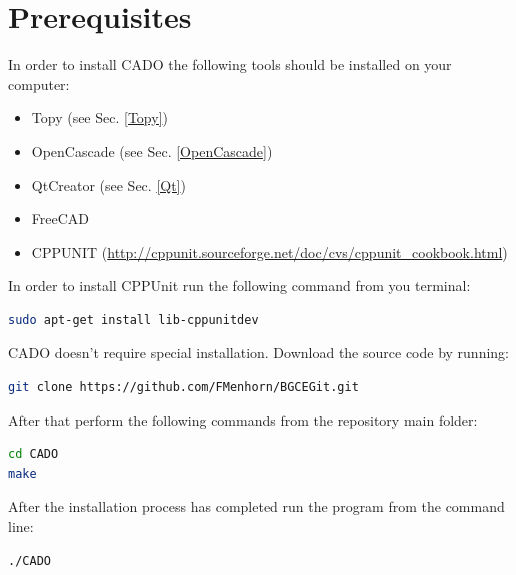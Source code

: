 \documentclass[11pt,a4paper,article,bibtotoc,idxtotoc,headsepline,footsepline,footexclude,DIV13,oneside]{scrbook}
\begin{document}
\section{Prerequisites}
In order to install CADO the following tools should be installed on your computer:
\begin{itemize}
	\item Topy (see Sec. \ref{Topy})
	\item OpenCascade (see Sec. \ref{OpenCascade})
	\item QtCreator (see Sec. \ref{Qt})
	\item FreeCAD
	\item CPPUNIT (\href{http://cppunit.sourceforge.net/doc/cvs/cppunit_cookbook.html}{http://cppunit.sourceforge.net/doc/cvs/cppunit\_cookbook.html})
	\end{itemize}
In order to install CPPUnit run the following command from you terminal:
\begin{lstlisting}[language=bash]
sudo apt-get install lib-cppunitdev
\end{lstlisting}
CADO doesn't require special installation. Download the source code by running:
\begin{lstlisting}[language=bash]
git clone https://github.com/FMenhorn/BGCEGit.git
\end{lstlisting}	
After that perform the following commands from the repository main folder:
\begin{lstlisting}[language=bash]
cd CADO
make
\end{lstlisting}	
After the installation process has completed run the program from the command line:
\begin{lstlisting}[language=bash]
./CADO
\end{lstlisting}	


  	\clearemptydoublepage
	
 
\end{document}
